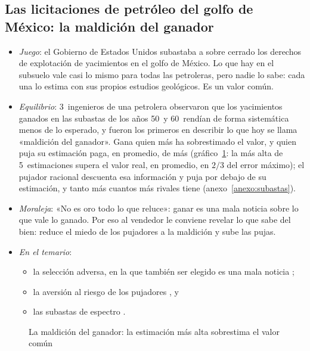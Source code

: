 \documentclass[11pt]{article}
\begin{document}
\subsection*{Las licitaciones de petróleo del golfo de México:\cortetitulo{} la maldición del ganador}

\begin{itemize}
\item \emph{Juego}\nocite{CapenClappCampbell1971Competitive}: el Gobierno de Estados Unidos subastaba a sobre cerrado los derechos de explotación de yacimientos en el golfo de México. Lo que hay en el subsuelo vale casi lo mismo para todas las petroleras, pero nadie lo sabe: cada una lo estima con sus propios estudios geológicos. Es un valor común.
\item \emph{Equilibrio}: 3~ingenieros de una petrolera observaron que los yacimientos ganados en las subastas de los años 50~y 60~rendían de forma sistemática menos de lo esperado, y fueron los primeros en describir lo que hoy se llama «maldición del ganador»\nocite{Thaler1988Anomalies}. Gana quien más ha sobrestimado el valor, y quien puja su estimación paga, en promedio, de más (gráfico~\ref{fig:maldicion-ganador}: la más alta de 5~estimaciones supera el valor real, en promedio, en $2/3$ del error máximo); el pujador racional descuenta esa información y puja por debajo de su estimación, y tanto más cuantos más rivales tiene\nocite{Wilson1977Bidding} (anexo~\ref{anexo:subastas}).
\item \emph{Moraleja}: «No es oro todo lo que reluce»: ganar es una mala noticia sobre lo que vale lo ganado. Por eso al vendedor le conviene revelar lo que sabe del bien: reduce el miedo de los pujadores a la maldición y sube las pujas\nocite{MilgromWeber1982Theory}.
\item \emph{En el temario}:
  \begin{itemize}
  \item la selección adversa, en la que también ser elegido es una mala noticia ;
  \item la aversión al riesgo de los pujadores , y
  \item las subastas de espectro .
  \end{itemize}
\end{itemize}

\begin{figure}[H]
\centering
\caption{La maldición del ganador: la estimación más alta sobrestima el valor común}\label{fig:maldicion-ganador}
\end{figure}
\end{document}
